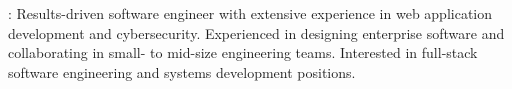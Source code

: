 \documentclass[]{deedy_format_Hien}
\begin{document}
%
%
\lastupdated

%
%


{: Results-driven software engineer with extensive experience in web application development and cybersecurity. Experienced in designing enterprise software and collaborating in small- to mid-size engineering teams. Interested in full-stack software engineering and systems development positions.}

%
%
\end{document}
